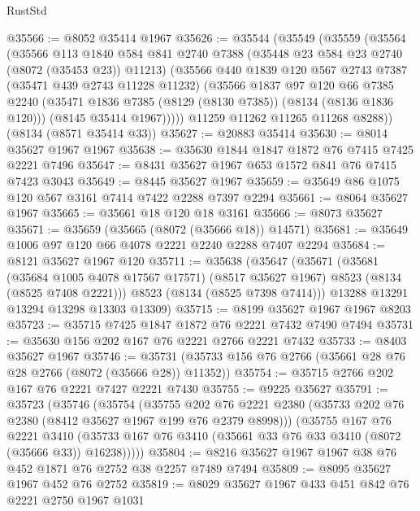 \begin{lexlean}{RustStd}
\begin{coremodule}
{\begin{coremodule}
{{{{{{{{{{{{{{{{{{{{{{{{{{{{{{{{{{{{{{{{{{{{{{{{{{{{{@35566 := @8052 @35414 @1967
@35626 := @35544
    (@35549
      (@35559
        (@35564
          (@35566
            @113
            @1840
            @584
            @841
            @2740
            @7388
            (@35448 @23 @584 @23 @2740 (@8072 (@35453 @23)) @11213)
            (@35566
              @440
              @1839
              @120
              @567
              @2743
              @7387
              (@35471 @439 @2743 @11228 @11232)
              (@35566
                @1837
                @97
                @120
                @66
                @7385
                @2240
                (@35471 @1836 @7385 (@8129 (@8130 @7385)) (@8134 (@8136 @1836 @120)))
                (@8145 @35414 @1967)))))
        @11259
        @11262
        @11265
        @11268
        @8288))
    (@8134 (@8571 @35414 @33))
@35627 := @20883 @35414
@35630 := @8014 @35627 @1967 @1967
@35638 := @35630 @1844 @1847 @1872 @76 @7415 @7425 @2221 @7496
@35647 := @8431 @35627 @1967 @653 @1572 @841 @76 @7415 @7423 @3043
@35649 := @8445 @35627 @1967
@35659 := @35649 @86 @1075 @120 @567 @3161 @7414 @7422 @2288 @7397 @2294
@35661 := @8064 @35627 @1967
@35665 := @35661 @18 @120 @18 @3161
@35666 := @8073 @35627
@35671 := @35659 (@35665 (@8072 (@35666 @18)) @14571)
@35681 := @35649 @1006 @97 @120 @66 @4078 @2221 @2240 @2288 @7407 @2294
@35684 := @8121 @35627 @1967 @120
@35711 := @35638
    (@35647
      (@35671
        (@35681
          (@35684 @1005 @4078 @17567 @17571)
          (@8517 @35627 @1967)
          @8523
          (@8134 (@8525 @7408 @2221)))
        @8523
        (@8134 (@8525 @7398 @7414)))
      @13288
      @13291
      @13294
      @13298
      @13303
      @13309)
@35715 := @8199 @35627 @1967 @1967 @8203
@35723 := @35715 @7425 @1847 @1872 @76 @2221 @7432 @7490 @7494
@35731 := @35630 @156 @202 @167 @76 @2221 @2766 @2221 @7432
@35733 := @8403 @35627 @1967
@35746 := @35731 (@35733 @156 @76 @2766 (@35661 @28 @76 @28 @2766 (@8072 (@35666 @28)) @11352))
@35754 := @35715 @2766 @202 @167 @76 @2221 @7427 @2221 @7430
@35755 := @9225 @35627
@35791 := @35723
    (@35746
      (@35754
        (@35755
          @202
          @76
          @2221
          @2380
          (@35733 @202 @76 @2380 (@8412 @35627 @1967 @199 @76 @2379 @8998)))
        (@35755
          @167
          @76
          @2221
          @3410
          (@35733 @167 @76 @3410 (@35661 @33 @76 @33 @3410 (@8072 (@35666 @33)) @16238)))))
@35804 := @8216 @35627 @1967 @1967 @38 @76 @452 @1871 @76 @2752 @38 @2257 @7489 @7494
@35809 := @8095 @35627 @1967 @452 @76 @2752
@35819 := @8029 @35627 @1967 @433 @451 @842 @76 @2221 @2750 @1967 @1031
}}}}}}}}}}}}}}}}}}}}}}}}}}}}}}}}}}}}}}}}}}}}}}}}}}}}}
\end{coremodule}}
\end{coremodule}
\end{lexlean}
